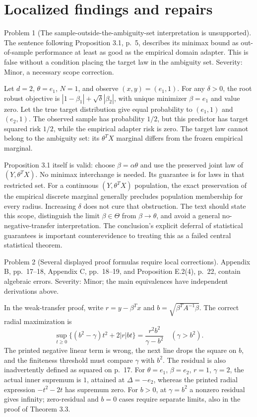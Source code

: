 \documentclass[10pt]{article}
\begin{document}
\section*{Localized findings and repairs}
Problem 1 (The sample-outside-the-ambiguity-set interpretation is unsupported).  The sentence following Proposition 3.1, p. 5, describes its minimax bound as out-of-sample performance at least as good as the empirical domain adapter. This is false without a condition placing the target law in the ambiguity set. Severity: Minor, a necessary scope correction.\par
Let \(d=2\), \(\theta=e_1\), \(N=1\), and observe \((x,y)=(e_1,1)\). For any \(\delta>0\), the root robust objective is \(|1-\beta_1|+\sqrt\delta|\beta_2|\), with unique minimizer \(\beta=e_1\) and value zero. Let the true target distribution give equal probability to \((e_1,1)\) and \((e_2,1)\). The observed sample has probability \(1/2\), but this predictor has target squared risk \(1/2\), while the empirical adapter risk is zero. The target law cannot belong to the ambiguity set: its \(\theta^TX\) marginal differs from the frozen empirical marginal.\par
Proposition 3.1 itself is valid: choose \(\beta=\alpha\theta\) and use the preserved joint law of \((Y,\theta^TX)\). No minimax interchange is needed. Its guarantee is for laws in that restricted set. For a continuous \((Y,\theta^TX)\) population, the exact preservation of the empirical discrete marginal generally precludes population membership for every radius. Increasing \(\delta\) does not cure that obstruction. The text should state this scope, distinguish the limit \(\beta\in\Theta\) from \(\beta\to\theta\), and avoid a general no-negative-transfer interpretation. The conclusion’s explicit deferral of statistical guarantees is important counterevidence to treating this as a failed central statistical theorem.\par
Problem 2 (Several displayed proof formulas require local corrections).  Appendix B, pp. 17–18, Appendix C, pp. 18–19, and Proposition E.2(4), p. 22, contain algebraic errors. Severity: Minor; the main equivalences have independent derivations above.\par
In the weak-transfer proof, write \(r=y-\beta^Tx\) and \(b=\sqrt{\beta^TA^{-1}\beta}\). The correct radial maximization is \[\sup_{t\geq0}\{(b^2-\gamma)t^2+2|r|bt\}
 =\frac{r^2b^2}{\gamma-b^2}\quad(\gamma>b^2).\] The printed negative linear term is wrong, the next line drops the square on \(b\), and the finiteness threshold must compare \(\gamma\) with \(b^2\). The residual is also inadvertently defined as squared on p. 17. For \(\theta=e_1\), \(\beta=e_2\), \(r=1\), \(\gamma=2\), the actual inner supremum is \(1\), attained at \(\Delta=-e_2\), whereas the printed radial expression \(-t^2-2t\) has supremum zero. For \(b>0\), at \(\gamma=b^2\) a nonzero residual gives infinity; zero-residual and \(b=0\) cases require separate limits, also in the proof of Theorem 3.3.\par
\end{document}
